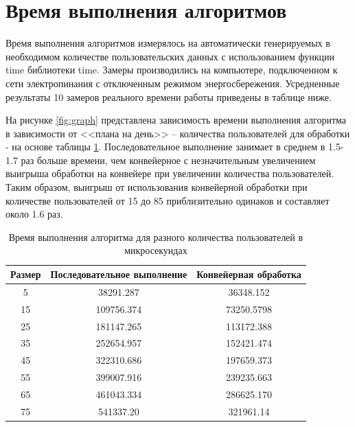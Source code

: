 \documentclass[../report.tex]{subfiles}
\begin{document}
\section{Время выполнения алгоритмов}
Время выполнения алгоритмов измерялось на автоматически генерируемых в необходимом количестве пользовательских данных с использованием функции time библиотеки time. Замеры производились на компьютере, подключенном к сети электропинания с отключенным режимом энергосбережения. Усредненные результаты 10 замеров реального времени работы приведены в таблице ниже.

На рисунке \ref{fig:graph} представлена зависимость времени выполнения алгоритма в зависимости от <<плана на день>> -- количества пользователей для обработки - на основе таблицы \ref{tab:time}. Последовательное выполнение занимает в среднем в 1.5-1.7 раз больше времени, чем конвейерное с незначительным увеличением выигрыша обработки на конвейере при увеличении количества пользователей. Таким образом, выигрыш от использования конвейерной обработки при количестве пользователей от 15 до 85 приблизительно одинаков и составляет около 1.6 раз.
\begin{table}[H]
	\begin{center}
		\captionsetup{justification=raggedleft, singlelinecheck=false}
		\caption{\label{tab:time} Время выполнения алгоритма для разного количества пользователей в микросекундах}
		\begin{tabular}{|c| c | c|} 
			\hline
			Размер&Последовательное выполнение&Конвейерная обработка\\ [0.5ex]
			\hline
			5 &   38291.287 &  36348.152\\ 
			\hline
			15 &   109756.374 &   73250.5798 \\ 
			\hline
			25 &   181147.265 &   113172.388 \\ 
			\hline
			35 &   252654.957 &   152421.474 \\ 
			\hline
			45 &  322310.686 &  197659.373 \\ 
			\hline
			55 & 399007.916 & 239235.663 \\ 
			\hline
			65 & 461043.334 & 286625.170 \\ 
			\hline
			75 & 541337.20 & 321961.14 \\ 
			\hline
		\end{tabular}
	\end{center}
\end{table}
\end{document}

